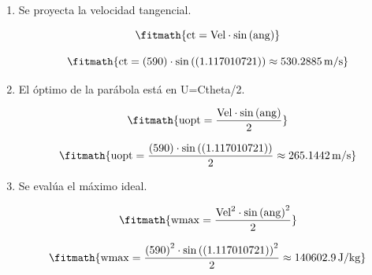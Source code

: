 \begin{enumerate}

\item Se proyecta la velocidad tangencial.

\[\fitmath{\mathrm{ct}=\mathrm{Vel}\cdot \sin\left(\mathrm{ang}\right)}\]

\[\fitmath{\mathrm{ct}=(590)\cdot \sin\left((1.117010721)\right)\approx 530.2885\,\mathrm{m/s}}\]

\item El óptimo de la parábola está en U=Ctheta/2.

\[\fitmath{\mathrm{uopt}=\frac{\mathrm{Vel}\cdot \sin\left(\mathrm{ang}\right)}{2}}\]

\[\fitmath{\mathrm{uopt}=\frac{(590)\cdot \sin\left((1.117010721)\right)}{2}\approx 265.1442\,\mathrm{m/s}}\]

\item Se evalúa el máximo ideal.

\[\fitmath{\mathrm{wmax}=\frac{{\mathrm{Vel}}^{2}\cdot {\sin\left(\mathrm{ang}\right)}^{2}}{2}}\]

\[\fitmath{\mathrm{wmax}=\frac{{(590)}^{2}\cdot {\sin\left((1.117010721)\right)}^{2}}{2}\approx 140602.9\,\mathrm{J/kg}}\]

\end{enumerate}
